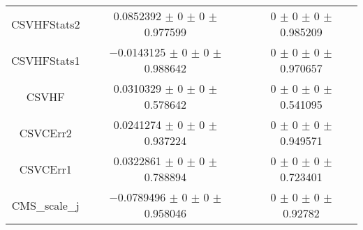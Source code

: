 \begin{table}
\begin{tabular}{ccc}
CSVHFStats2 & \num{0.0852392} $\pm$ \num{0} $\pm$ \num{0} $\pm$ \num{0.977599} & \num{0} $\pm$ \num{0} $\pm$ \num{0} $\pm$ \num{0.985209}\\
CSVHFStats1 & \num{-0.0143125} $\pm$ \num{0} $\pm$ \num{0} $\pm$ \num{0.988642} & \num{0} $\pm$ \num{0} $\pm$ \num{0} $\pm$ \num{0.970657}\\
CSVHF & \num{0.0310329} $\pm$ \num{0} $\pm$ \num{0} $\pm$ \num{0.578642} & \num{0} $\pm$ \num{0} $\pm$ \num{0} $\pm$ \num{0.541095}\\
CSVCErr2 & \num{0.0241274} $\pm$ \num{0} $\pm$ \num{0} $\pm$ \num{0.937224} & \num{0} $\pm$ \num{0} $\pm$ \num{0} $\pm$ \num{0.949571}\\
CSVCErr1 & \num{0.0322861} $\pm$ \num{0} $\pm$ \num{0} $\pm$ \num{0.788894} & \num{0} $\pm$ \num{0} $\pm$ \num{0} $\pm$ \num{0.723401}\\
CMS\_scale\_j & \num{-0.0789496} $\pm$ \num{0} $\pm$ \num{0} $\pm$ \num{0.958046} & \num{0} $\pm$ \num{0} $\pm$ \num{0} $\pm$ \num{0.92782}\\
\bottomrule
\end{tabular}
\end{table}